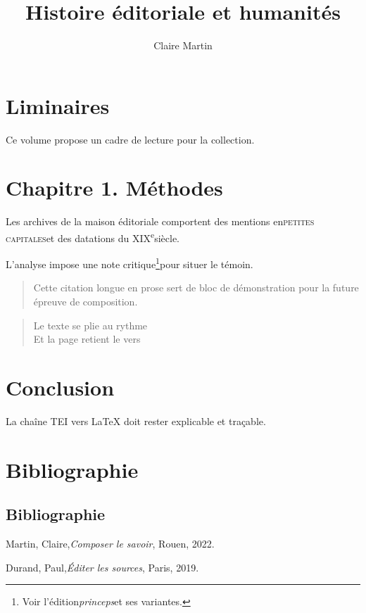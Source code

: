\documentclass[11pt,oneside,openany]{memoir}
\begin{document}
\title{Histoire éditoriale et humanités}
\author{Claire Martin}
\maketitle

\chapter*{Liminaires}
Ce volume propose un cadre de lecture pour la collection.

\chapter{Chapitre 1. Méthodes}
Les archives de la maison éditoriale comportent des mentions en\textsc{petites capitales}et des datations du XIX\textsuperscript{e}siècle.

L'analyse impose une note critique\footnote{Voir l'édition\textit{princeps}et ses variantes.}pour situer le témoin.

\begin{quote}\small
Cette citation longue en prose sert de bloc de démonstration pour la future épreuve de composition.
\end{quote}

\begin{verse}
Le texte se plie au rythme\\
Et la page retient le vers\\
\end{verse}

\chapter*{Conclusion}
La chaîne TEI vers LaTeX doit rester explicable et traçable.

\chapter*{Bibliographie}
\section*{Bibliographie}
\noindent Martin, Claire,\textit{Composer le savoir}, Rouen, 2022.\par
\noindent Durand, Paul,\textit{Éditer les sources}, Paris, 2019.\par
\end{document}
